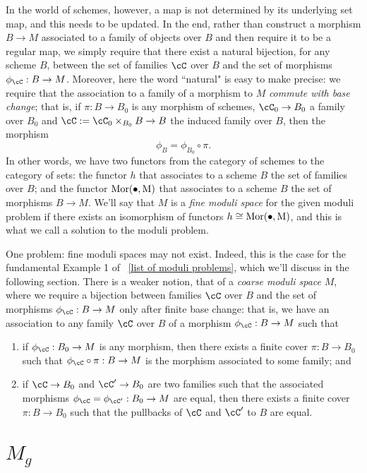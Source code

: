 In the world of schemes, however, a map is not determined by its underlying set map, and this needs to be updated. In the end, rather than construct a morphism $B \to M$ associated to a family of objects over $B$ and then require it to be a regular map, we simply require that there exist a natural bijection, for any scheme $B$, between the set of families $\cC$ over $B$ and the set of morphisms $\phi_\cC : B \to M$. Moreover, here the word ``natural" is easy to make precise: we require that the association to a family of a morphism to $M$ \emph{commute with base change}; that is, if $\pi : B \to B_0$ is any morphism of schemes, $\cC_0 \to B_0$ a family over $B_0$ and $\cC := \cC_0 \times_{B_0} B \to B$ the induced family over $B$, then the morphism
$$
\phi_B = \phi_{B_0} \circ \pi.
$$
In other words, we have two functors from the category of schemes to the category of sets: the functor $h$ that associates to a scheme $B$ the set of families over $B$; and the functor $\rm{Mor}(\bullet, M)$ that associates to a scheme $B$ the set of morphisms $B \to M$. We'll say that $M$ is a \emph{fine moduli space} for the given moduli problem if there exists an isomorphism of functors $h \cong \rm{Mor}(\bullet, M)$, and this is what we call a solution to the moduli problem.

One problem: fine moduli spaces may not exist. Indeed, this is the case for the fundamental Example 1 of ~\ref{list of moduli problems}, which we'll discuss in the following section. There is a weaker notion, that of a \emph{coarse moduli space} $M$, where we require a bijection between families $\cC$ over $B$ and the set of morphisms $\phi_\cC : B \to M$ only after finite base change: that is, we have an association to any family $\cC$ over $B$ of a morphism $\phi_\cC : B \to M$ such that

\begin{enumerate}
\item if $\phi_\cC : B_0 \to M$ is any morphism, then there exists a finite cover $\pi : B \to B_0$ such that $\phi_\cC \circ \pi : B \to M$ is the morphism associated to some family; and
\item if $\cC \to B_0$ and $\cC' \to B_0$ are two families such that the associated morphisms $\phi_\cC = \phi_{\cC'} : B_0 \to M$ are equal, then there exists a finite cover $\pi : B \to B_0$ such that the pullbacks of $\cC$ and $\cC'$ to $B$ are equal.
\end{enumerate}

\section{$M_g$}

